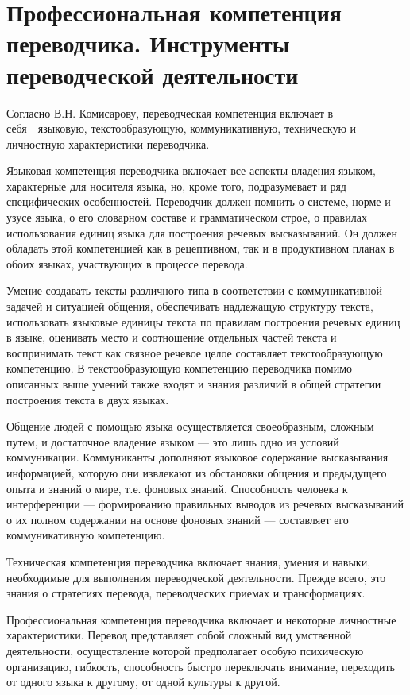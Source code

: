 \section{Профессиональная компетенция переводчика. Инструменты переводческой деятельности}

Согласно В.Н. Комисарову, переводческая компетенция включает в себя  языковую, текстообразующую, коммуникативную, техническую и личностную характеристики переводчика.

Языковая компетенция переводчика включает все аспекты владения языком, характерные для носителя языка, но, кроме того, подразумевает и ряд специфических особенностей. Переводчик должен помнить о системе, норме и узусе языка, о его словарном составе и грамматическом строе, о правилах использования единиц языка для построения речевых высказываний. Он должен обладать этой компетенцией как в рецептивном, так и в продуктивном планах в обоих языках, участвующих в процессе перевода.

Умение создавать тексты различного типа в соответствии с коммуникативной задачей и ситуацией общения, обеспечивать надлежащую структуру текста, использовать языковые единицы текста по правилам построения речевых единиц в языке, оценивать место и соотношение отдельных частей текста и воспринимать текст как связное речевое целое составляет текстообразующую компетенцию. В текстообразующую компетенцию переводчика помимо описанных выше умений также входят и знания различий в общей стратегии построения текста в двух языках.

Общение людей с помощью языка осуществляется своеобразным, сложным путем, и достаточное владение языком --- это лишь одно из условий коммуникации. Коммуниканты дополняют языковое содержание высказывания информацией, которую они извлекают из обстановки общения и предыдущего опыта и знаний о мире, т.е. фоновых знаний. Способность человека к интерференции --- формированию правильных выводов из речевых высказываний о их полном содержании на основе фоновых знаний --- составляет его коммуникативную компетенцию.

Техническая компетенция переводчика включает знания, умения и навыки, необходимые для выполнения переводческой деятельности. Прежде всего, это знания о стратегиях перевода, переводческих приемах и трансформациях.

Профессиональная компетенция переводчика включает и некоторые личностные характеристики. Перевод представляет собой сложный вид умственной деятельности, осуществление которой предполагает особую психическую организацию, гибкость, способность быстро переключать внимание, переходить от одного языка к другому, от одной культуры к другой.

